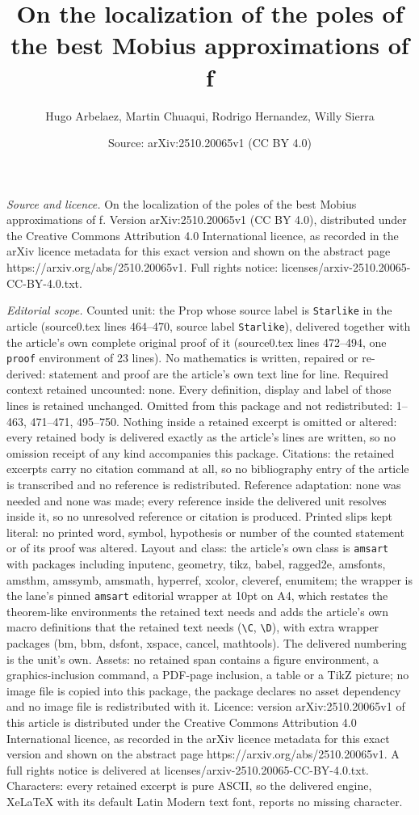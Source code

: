 \documentclass[10pt,a4paper]{amsart}
\title[On the localization of the poles of the best Mobius approxim]{On the localization of the poles of the best Mobius approximations of f}
\author{Hugo Arbelaez, Martin Chuaqui, Rodrigo Hernandez, Willy Sierra}
\date{Source: arXiv:2510.20065v1 (CC BY 4.0)}
\begin{document}
\maketitle

\noindent\emph{Source and licence.} On the localization of the poles of the best Mobius approximations of f. Version arXiv:2510.20065v1 (CC BY 4.0), distributed under the Creative Commons Attribution 4.0 International licence, as recorded in the arXiv licence metadata for this exact version and shown on the abstract page https://arxiv.org/abs/2510.20065v1. Full rights notice: licenses/arxiv-2510.20065-CC-BY-4.0.txt.\par\smallskip

\noindent\textit{Editorial scope.} Counted unit: the Prop whose source label is \texttt{Starlike} in the article (source0.tex lines 464--470, source label \texttt{Starlike}), delivered together with the article's own complete original proof of it (source0.tex lines 472--494, one \texttt{proof} environment of 23 lines). No mathematics is written, repaired or re-derived: statement and proof are the article's own text line for line. Required context retained uncounted: none. Every definition, display and label of those lines is retained unchanged. Omitted from this package and not redistributed: 1--463, 471--471, 495--750. Nothing inside a retained excerpt is omitted or altered: every retained body is delivered exactly as the article's lines are written, so no omission receipt of any kind accompanies this package. Citations: the retained excerpts carry no citation command at all, so no bibliography entry of the article is transcribed and no reference is redistributed. Reference adaptation: none was needed and none was made; every reference inside the delivered unit resolves inside it, so no unresolved reference or citation is produced. Printed slips kept literal: no printed word, symbol, hypothesis or number of the counted statement or of its proof was altered. Layout and class: the article's own class is \texttt{amsart} with packages including inputenc, geometry, tikz, babel, ragged2e, amsfonts, amsthm, amssymb, amsmath, hyperref, xcolor, cleveref, enumitem; the wrapper is the lane's pinned \texttt{amsart} editorial wrapper at 10pt on A4, which restates the theorem-like environments the retained text needs and adds the article's own macro definitions that the retained text needs (\texttt{\textbackslash C}, \texttt{\textbackslash D}), with extra wrapper packages (bm, bbm, dsfont, xspace, cancel, mathtools). The delivered numbering is the unit's own. Assets: no retained span contains a figure environment, a graphics-inclusion command, a PDF-page inclusion, a table or a TikZ picture; no image file is copied into this package, the package declares no asset dependency and no image file is redistributed with it. Licence: version arXiv:2510.20065v1 of this article is distributed under the Creative Commons Attribution 4.0 International licence, as recorded in the arXiv licence metadata for this exact version and shown on the abstract page https://arxiv.org/abs/2510.20065v1. A full rights notice is delivered at licenses/arxiv-2510.20065-CC-BY-4.0.txt. Characters: every retained excerpt is pure ASCII, so the delivered engine, XeLaTeX with its default Latin Modern text font, reports no missing character.
\end{document}
